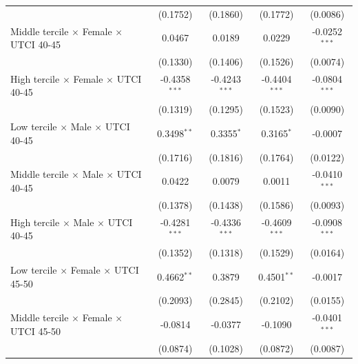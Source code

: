 \begin{table}[htbp]
\begin{tabular}{lcccc}
                                                           & (0.1752)        & (0.1860)            & (0.1772)          & (0.0086)\\   
      Middle tercile $\times$ Female $\times$ UTCI 40-45   & 0.0467          & 0.0189              & 0.0229            & -0.0252$^{***}$\\   
                                                           & (0.1330)        & (0.1406)            & (0.1526)          & (0.0074)\\   
      High tercile $\times$ Female $\times$ UTCI 40-45     & -0.4358$^{***}$ & -0.4243$^{***}$     & -0.4404$^{***}$   & -0.0804$^{***}$\\   
                                                           & (0.1319)        & (0.1295)            & (0.1523)          & (0.0090)\\   
      Low tercile $\times$ Male $\times$ UTCI 40-45        & 0.3498$^{**}$   & 0.3355$^{*}$        & 0.3165$^{*}$      & -0.0007\\   
                                                           & (0.1716)        & (0.1816)            & (0.1764)          & (0.0122)\\   
      Middle tercile $\times$ Male $\times$ UTCI 40-45     & 0.0422          & 0.0079              & 0.0011            & -0.0410$^{***}$\\   
                                                           & (0.1378)        & (0.1438)            & (0.1586)          & (0.0093)\\   
      High tercile $\times$ Male $\times$ UTCI 40-45       & -0.4281$^{***}$ & -0.4336$^{***}$     & -0.4609$^{***}$   & -0.0908$^{***}$\\   
                                                           & (0.1352)        & (0.1318)            & (0.1529)          & (0.0164)\\   
      Low tercile $\times$ Female $\times$ UTCI 45-50      & 0.4662$^{**}$   & 0.3879              & 0.4501$^{**}$     & -0.0017\\   
                                                           & (0.2093)        & (0.2845)            & (0.2102)          & (0.0155)\\   
      Middle tercile $\times$ Female $\times$ UTCI 45-50   & -0.0814         & -0.0377             & -0.1090           & -0.0401$^{***}$\\   
                                                           & (0.0874)        & (0.1028)            & (0.0872)          & (0.0087)\\   

\end{tabular}
\end{table}
